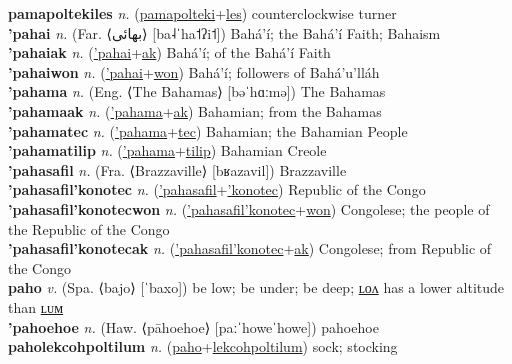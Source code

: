 \textbf{pamapoltekiles} \textit{n.} (\hyperref[pamapolteki]{pamapolteki}+\hyperref[les]{les})
counterclockwise turner \label{pamapoltekiles} \\
\textbf{'pahai} \textit{n.} (Far. ⟨بهائی‎⟩ [ba˨ˈha˦ʔi˦])
Bahá’í; the Bahá’í Faith; Bahaism \label{'pahai} \\
\textbf{'pahaiak} \textit{n.} (\hyperref['pahai]{'pahai}+\hyperref[ak]{ak})
Bahá’í; of the Bahá’í Faith \label{'pahaiak} \\
\textbf{'pahaiwon} \textit{n.} (\hyperref['pahai]{'pahai}+\hyperref[won]{won})
Bahá’í; followers of Bahá’u’lláh \label{'pahaiwon} \\
\textbf{'pahama} \textit{n.} (Eng. ⟨The Bahamas⟩ [bəˈhɑːmə])
The Bahamas \label{'pahama} \\
\textbf{'pahamaak} \textit{n.} (\hyperref['pahama]{'pahama}+\hyperref[ak]{ak})
Bahamian; from the Bahamas \label{'pahamaak} \\
\textbf{'pahamatec} \textit{n.} (\hyperref['pahama]{'pahama}+\hyperref[tec]{tec})
Bahamian; the Bahamian People \label{'pahamatec} \\
\textbf{'pahamatilip} \textit{n.} (\hyperref['pahama]{'pahama}+\hyperref[tilip]{tilip})
Bahamian Creole \label{'pahamatilip} \\
\textbf{'pahasafil} \textit{n.} (Fra. ⟨Brazzaville⟩ [bʁazavil])
Brazzaville \label{'pahasafil} \\
\textbf{'pahasafil'konotec} \textit{n.} (\hyperref['pahasafil]{'pahasafil}+\hyperref['konotec]{'konotec})
Republic of the Congo \label{'pahasafil'konotec} \\
\textbf{'pahasafil'konotecwon} \textit{n.} (\hyperref['pahasafil'konotec]{'pahasafil'konotec}+\hyperref[won]{won})
Congolese; the people of the Republic of the Congo \label{'pahasafil'konotecwon} \\
\textbf{'pahasafil'konotecak} \textit{n.} (\hyperref['pahasafil'konotec]{'pahasafil'konotec}+\hyperref[ak]{ak})
Congolese; from Republic of the Congo \label{'pahasafil'konotecak} \\
\textbf{paho} \textit{v.} (Spa. ⟨bajo⟩ [ˈbaxo])
be low; be under; be deep; \hyperref[paholon]{ʟᴏᴧ} has a lower altitude than \hyperref[paholum]{ʟᴜᴍ} \label{paho} \\
\textbf{'pahoehoe} \textit{n.} (Haw. ⟨pāhoehoe⟩ [paːˈhoweˈhowe])
pahoehoe \label{'pahoehoe} \\
\textbf{paholekcohpoltilum} \textit{n.} (\hyperref[paho]{paho}+\hyperref[lekcohpoltilum]{lekcohpoltilum})
sock; stocking \label{paholekcohpoltilum} \\
